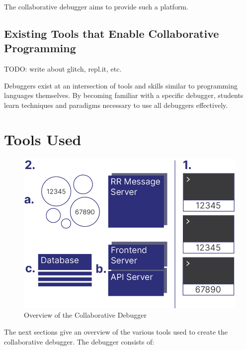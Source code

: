 \documentclass[12pt]{article}
\begin{document}
The collaborative debugger aims to provide such a platform.

\subsection{Existing Tools that Enable Collaborative Programming} \label{exisitingcollab}

TODO: write about glitch, repl.it, etc.


Debuggers exist at an intersection of tools and skills similar to
programming languages themselves. By becoming familiar with a specific
debugger, students learn techniques and paradigms necessary to use all
debuggers effectively.


\section{Tools Used}

\begin{figure}[h!]

  \includegraphics[scale=.8]{overall_system}
  \centering
  \caption{Overview of the Collaborative Debugger}
  \label{debugger:overview}
\end{figure}

The next sections give an overview of the various tools used to create
the collaborative debugger.  The debugger consists of:
\end{document}
